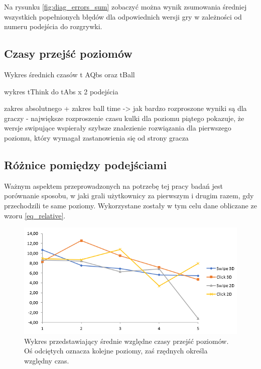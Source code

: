 \documentclass[a4paper,12pt,numbers=noenddot]{report}
\begin{document}
Na rysunku \ref{fig:diag_errors_sum} zobaczyć można wynik zsumowania średniej wszystkich popełnionych błędów dla odpowiednich wersji gry w zależności od numeru podejścia do rozgrywki.


\subsection{Czasy przejść poziomów}

Wykres średnich czasów t AQbs oraz tBall

wykres tThink do tAbs x 2 podejścia


zakres absolutnego + zakres ball time -> jak bardzo rozproszone wyniki są dla graczy - największe rozproszenie czasu kulki dla poziomu piątego pokazuje, że wersje swipujące wspierały szybsze znalezienie rozwiązania dla pierwszego poziomu, który wymagał zastanowienia się od strony gracza

\subsection{Różnice pomiędzy podejściami}
Ważnym aspektem przeprowadzonych na potrzebę tej pracy badań jest porównanie sposobu, w jaki grali użytkownicy za pierwszym i drugim razem, gdy przechodzili te same poziomy. Wykorzystane zostały w tym celu dane obliczane ze wzoru \ref{eq_relative}.

\begin{figure}[h!]
	\centering
  	\includegraphics[width=0.9\linewidth]{diag/rel_mean_absTime.png}
	\caption{Wykres przedstawiający średnie względne czasy przejść poziomów. Oś odciętych oznacza kolejne poziomy, zaś rzędnych określa względny czas.}
	\label{fig:diag:rel:mean_AbsTime}
\end{figure}
\end{document}
